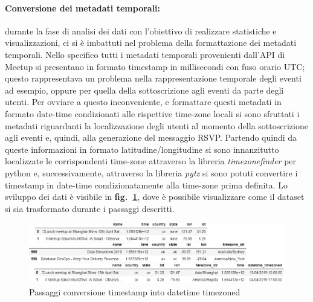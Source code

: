 \documentclass[fleqn,10pt]{SelfArx} %
\begin{document}
{{\paragraph{Conversione dei metadati temporali:} durante la fase di analisi dei dati con l'obiettivo di realizzare statistiche e visualizzazioni, ci si è imbattuti nel problema della formattazione dei metadati temporali. 
Nello specifico tutti i metadati temporali provenienti dall'API di Meetup si presentano in formato timestamp in millisecondi con fuso orario UTC; questo rappresentava un problema nella rappresentazione temporale degli eventi ad esempio, oppure per quella della sottoscrizione agli eventi da parte degli utenti. 
Per ovviare a questo inconveniente, e formattare questi metadati in formato date-time condizionati alle rispettive time-zone locali si sono sfruttati i metadati riguardanti la localizzazione degli utenti al momento della sottoscrizione agli eventi e, quindi, alla generazione del messaggio RSVP. 
Partendo quindi da queste informazioni in formato latitudine/longitudine si sono innanzitutto localizzate le corrispondenti time-zone attraverso la libreria \textit{timezonefinder} per python e, successivamente, attraverso la libreria \textit{pytz} si sono potuti convertire i timestamp in date-time condizionatamente alla time-zone prima definita. 
Lo sviluppo dei dati è visibile in \textbf{fig.~\ref{datetime_timezoned}}, dove è possibile visualizzare come il dataset si sia trasformato durante i passaggi descritti.
\begin{figure}
\centering
\includegraphics[width = 9 cm, height = 3.5 cm]{datetime_timezoned.PNG}
\vspace*{0.01cm}
\caption{\footnotesize \label{datetime_timezoned} Passaggi conversione timestamp into datetime timezoned}
\end{figure}
}}
\end{document}

